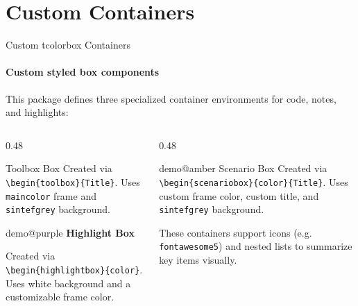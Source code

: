 
\section{Custom Containers}

\begin{frame}[fragile]{Custom tcolorbox Containers}
\framesubtitle{Custom styled box components}
This package defines three specialized container environments for code, notes, and highlights:
\begin{columns}[T]
    \begin{column}{0.48\textwidth}
        \begin{toolbox}{\faBriefcase\; Toolbox Box}
            \footnotesize
            Created via \texttt{\textbackslash begin\{toolbox\}\{Title\}}.
            Uses \texttt{maincolor} frame and \texttt{sintefgrey} background.
        \end{toolbox}
        
        \vspace{0.2cm}
        
        \begin{highlightbox}{demo@purple}
            \footnotesize
            \textbf{\faInfoCircle\; Highlight Box}
            
            Created via \texttt{\textbackslash begin\{highlightbox\}\{color\}}.
            Uses white background and a customizable frame color.
        \end{highlightbox}
    \end{column}
    \begin{column}{0.48\textwidth}
        \begin{scenariobox}{demo@amber}{\faExclamationTriangle\; Scenario Box}
            \footnotesize
            Created via \texttt{\textbackslash begin\{scenariobox\}\{color\}\{Title\}}.
            Uses custom frame color, custom title, and \texttt{sintefgrey} background.
        \end{scenariobox}
        
        \vspace{0.1cm}
        \scriptsize
        These containers support icons (e.g. \texttt{fontawesome5}) and nested lists to summarize key items visually.
    \end{column}
\end{columns}
\end{frame}

